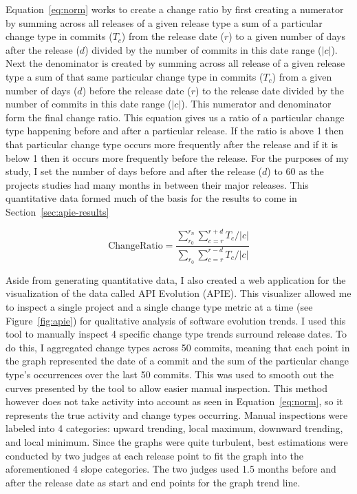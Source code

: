 Equation~\ref{eq:norm} works to create a change ratio by first creating a numerator by summing across all releases of
a given release type a sum of a particular change type in commits ($T_c$)
from the release date ($r$) to a given number of days after the release ($d$) divided by the number of commits in this date range ($|c|$). Next the denominator
is created by summing across all release of a given release type
a sum of that same particular change type in commits ($T_c$) from a given number of days ($d$) before the release date ($r$) to
the release date divided by the number of commits in this date range ($|c|$). This numerator and denominator form the final change ratio.
This equation gives us a ratio of a particular change type happening before and after a particular release. If the ratio is above 1 then that particular change
type occurs more frequently after the release and if it is below 1 then it occurs more frequently before the release. For the purposes of my study, I set the
number of days before and after the release ($d$) to 60 as the projects studies had many months in between their major releases. This quantitative data
formed much of the basis for the results to come in Section~\ref{sec:apie-results}

\begin{equation}
\text{ChangeRatio} = \frac{ \sum_{r_0}^{r_n}\sum_{c=r}^{r+d} T_c / |c|} { \sum_{r_0}\sum_{c=r}^{r-d} T_c / |c|}
\label{eq:norm}
\end{equation}

Aside from generating quantitative data, I also created a web application for the visualization of the data called API Evolution (APIE). This visualizer allowed
me to inspect a single project and a single change type metric at a time (see Figure~\ref{fig:apie}) for qualitative analysis of software evolution trends. I
used this tool to manually inspect 4 specific change type trends surround release dates. To do this, I aggregated change types across 50 commits, meaning that
each point in the graph represented the date of a commit and the sum of the particular change type's occurrences over the last 50 commits. This was used to smooth
out the curves presented by the tool to allow easier manual inspection. This method however does not take activity into account as seen in
Equation~\ref{eq:norm}, so it represents the true activity and change types occurring. Manual inspections were labeled into 4 categories: upward trending, local maximum, downward
trending, and local minimum. Since the graphs were quite turbulent, best estimations were conducted by two judges at each release point to fit the graph into the aforementioned
4 slope categories. The two judges used 1.5 months before and after the release date as start and end points for the graph trend line.

